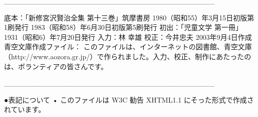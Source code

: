 \documentclass[a4paper,
tate,
book]
{jlreq}
\begin{document}
________________________________________

底本：「新修宮沢賢治全集  第十三巻」筑摩書房
      1980（昭和55）年3月15日初版第1刷発行
      1983（昭和58）年6月30日初版第5刷発行
初出：「児童文学  第一冊」
      1931（昭和6）年7月20日発行
入力：林  幸雄
校正：今井忠夫
2003年9月4日作成
青空文庫作成ファイル：
このファイルは、インターネットの図書館、青空文庫（http://www.aozora.gr.jp/）で作られました。入力、校正、制作にあたったのは、ボランティアの皆さんです。

________________________________________

●表記について
•	このファイルは W3C 勧告 XHTML1.1 にそった形式で作成されています。
\end{document}
